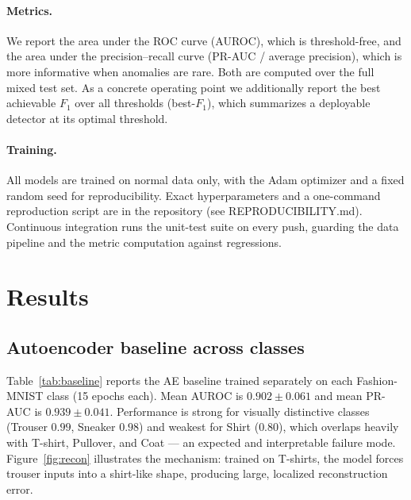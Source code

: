 \documentclass[11pt]{article}
\begin{document}
\paragraph{Metrics.} We report the area under the ROC curve (AUROC), which is
threshold-free, and the area under the precision--recall curve (PR-AUC / average
precision), which is more informative when anomalies are rare. Both are computed
over the full mixed test set. As a concrete operating point we additionally
report the best achievable $F_1$ over all thresholds (best-$F_1$), which
summarizes a deployable detector at its optimal threshold.

\paragraph{Training.} All models are trained on normal data only, with the Adam
optimizer and a fixed random seed for reproducibility. Exact hyperparameters and
a one-command reproduction script are in the repository (see REPRODUCIBILITY.md).
Continuous integration runs the unit-test suite on every push, guarding the data
pipeline and the metric computation against regressions.

\section{Results}
\subsection{Autoencoder baseline across classes}   %
Table~\ref{tab:baseline} reports the AE baseline trained separately on each
Fashion-MNIST class (15 epochs each). Mean AUROC is $0.902\pm0.061$ and mean
PR-AUC is $0.939\pm0.041$. Performance is strong for visually distinctive
classes (Trouser $0.99$, Sneaker $0.98$) and weakest for Shirt ($0.80$), which
overlaps heavily with T-shirt, Pullover, and Coat --- an expected and
interpretable failure mode. Figure~\ref{fig:recon} illustrates the mechanism:
trained on T-shirts, the model forces trouser inputs into a shirt-like shape,
producing large, localized reconstruction error.
\end{document}
